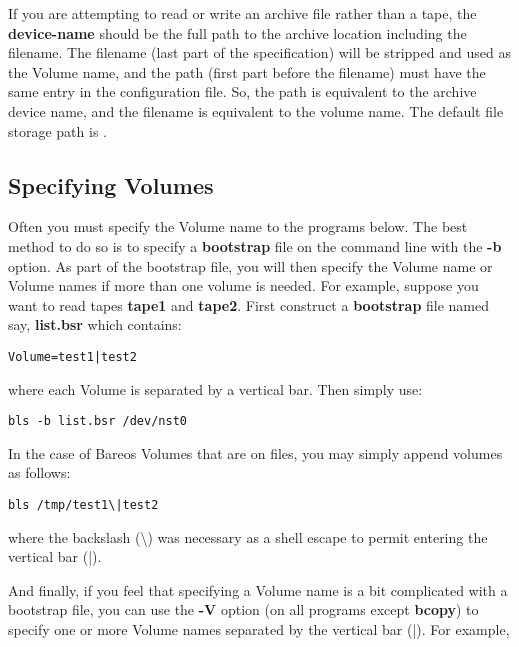 If you are attempting to read or write an archive file rather than a tape, the
{\bf device-name} should be the full path to the archive location including
the filename. The filename (last part of the specification) will be stripped
and used as the Volume name, and the path (first part before the filename)
must have the same entry in the configuration file. So, the path is equivalent
to the archive device name, and the filename is equivalent to the volume name.
The default file storage path is \fileStoragePath.

\subsection{Specifying Volumes}

Often you must specify the Volume name to the programs below.
The best method to do so is to specify a
{\bf bootstrap} file on the command line with the {\bf -b} option. As part of
the bootstrap file, you will then specify the Volume name or Volume names if
more than one volume is needed. For example, suppose you want to read tapes
{\bf tape1} and {\bf tape2}. First construct a {\bf bootstrap} file named say,
{\bf list.bsr} which contains:

\footnotesize
\begin{verbatim}
Volume=test1|test2
\end{verbatim}
\normalsize

where each Volume is separated by a vertical bar. Then simply use:

\footnotesize
\begin{verbatim}
bls -b list.bsr /dev/nst0
\end{verbatim}
\normalsize

In the case of Bareos Volumes that are on files, you may simply append volumes
as follows:

\footnotesize
\begin{verbatim}
bls /tmp/test1\|test2
\end{verbatim}
\normalsize

where the backslash (\textbackslash{}) was necessary as a shell escape to
permit entering the vertical bar (|).

And finally, if you feel that specifying a Volume name is a bit complicated
with a bootstrap file, you can use the {\bf -V} option (on all programs except
{\bf bcopy}) to specify one or more Volume names separated by the vertical bar
(|). For example,

